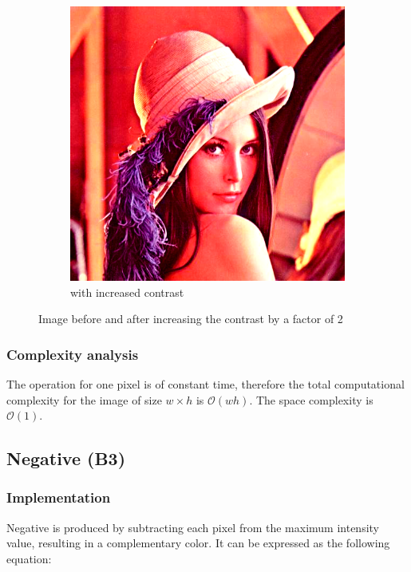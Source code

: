 \documentclass[12pt]{article}
\begin{document}
\begin{figure}[H]
\begin{subfigure}[t]{\subfiguresize}
        \includegraphics[width=\textwidth]{lenac_contrast_2x.png}
        \caption{with increased contrast}
    \end{subfigure}
    \caption{Image before and after increasing the contrast by a factor of 2}
\end{figure}

\subsubsection{Complexity analysis}

The operation for one pixel is of constant time,
therefore the total computational complexity for the image of size $w \times h$ is $\mathcal{O}(wh)$.
The space complexity is $\mathcal{O}(1)$.

\vspace{5em}
\pagebreak[3]
\subsection{Negative (B3)}

\subsubsection{Implementation}

Negative is produced by subtracting each pixel from the maximum intensity value, resulting in a complementary color.
It can be expressed as the following equation:
\end{document}
